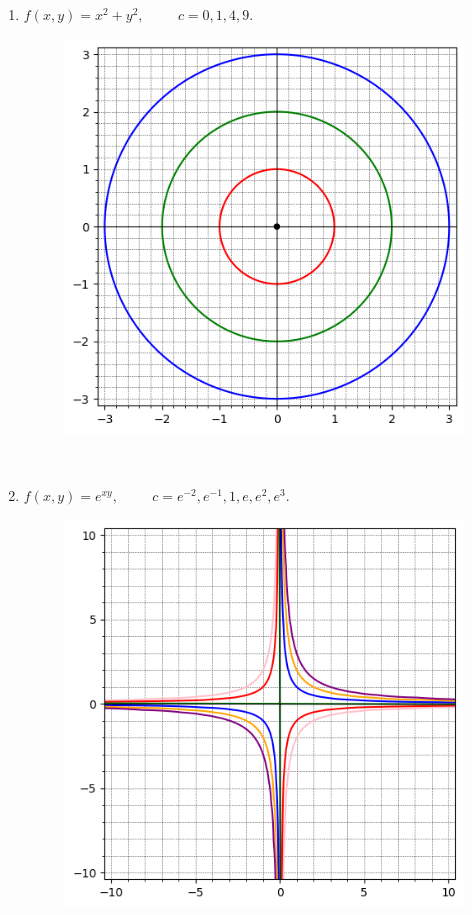 \documentclass{article}
\begin{document}
\begin{enumerate}
\begin{enumerate}[label=1.\arabic*.]
        \begin{enumerate}[label=(\alph*)]
            \item $f(x, y) = x^2 + y^2, \hspace{1cm} c = 0, 1, 4, 9.$
            \begin{figure}[!ht]
                \centering 
                \includegraphics[width=0.7\linewidth]{nivel1.png} 
                \label{fig:imagem1}
            \end{figure} \\
            \item $f(x, y) = e^{xy}, \hspace{1cm} c = e^{-2}, e^{-1}, 1, e, e^2, e^3.$
            \begin{figure}[!ht]
                \centering 
                \includegraphics[width=0.7\linewidth]{nivel2.png} 
                \label{fig:imagem1}

\end{figure}
\end{enumerate}
\end{enumerate}
\end{enumerate}
\end{document}
